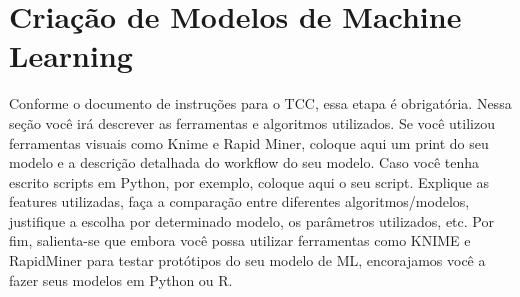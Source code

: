 \chapter{Criação de Modelos de Machine Learning}

Conforme o documento de instruções para o TCC, essa etapa é obrigatória. Nessa seção você irá descrever as ferramentas e algoritmos utilizados. Se você utilizou ferramentas visuais como Knime e Rapid Miner, coloque aqui um print do seu modelo e a descrição detalhada do workflow do seu modelo. Caso você tenha escrito scripts em Python, por exemplo, coloque aqui o seu script. Explique as features utilizadas, faça a comparação entre diferentes algoritmos/modelos, justifique a escolha por determinado modelo, os parâmetros utilizados, etc. Por fim, salienta-se que embora você possa utilizar ferramentas como KNIME e RapidMiner para testar protótipos do seu modelo de ML, encorajamos você a fazer seus modelos em Python ou R. 